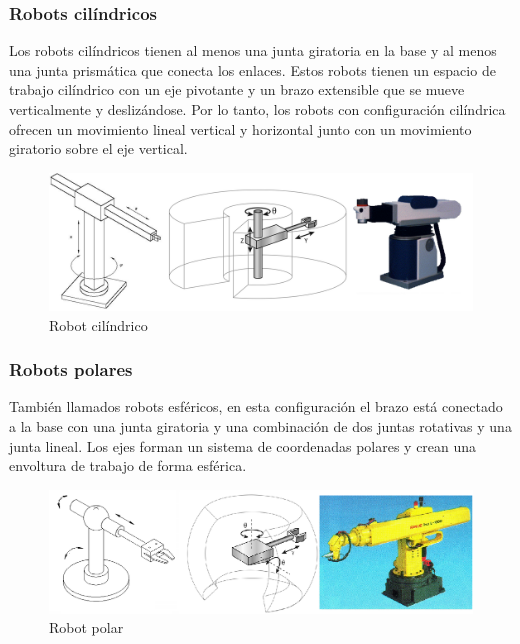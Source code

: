          \newpage

        
        \subsubsection{Robots cilíndricos}
        
        Los robots cilíndricos tienen al menos una junta giratoria en la base y al menos una junta prismática que conecta los enlaces. Estos robots tienen un espacio de trabajo cilíndrico con un eje pivotante y un brazo extensible que se mueve verticalmente y deslizándose. Por lo tanto, los robots con configuración cilíndrica ofrecen un movimiento lineal vertical y horizontal junto con un movimiento giratorio sobre el eje vertical.
        
        \begin{figure}[htb]
            \centering
            \includegraphics[width=1.0\linewidth]{Main/Chapter2/Images2/Robot-cilindrico.png}
            \caption{Robot cilíndrico \cite{cap2_class_polar_1}\cite{cap2_class_polar_cilin_2}\cite{cap2_class_polar_3}}
            \label{f:Cap2_segunMovimiento_cilindrico}
        \end{figure}
        
        \subsubsection{Robots polares}
        
        También llamados robots esféricos, en esta configuración el brazo está conectado a la base con una junta giratoria y una combinación de dos juntas rotativas y una junta lineal. Los ejes forman un sistema de coordenadas polares y crean una envoltura de trabajo de forma esférica.
        
        \begin{figure}[htb]
            \centering
            \includegraphics[width=1.0\linewidth]{Main/Chapter2/Images2/robot-polar.png}
            \caption{Robot polar \cite{cap2_class_polar_1}\cite{cap2_class_polar_cilin_2}  }
            \label{f:Cap2_segunMovimiento_polar}
        \end{figure}
    
